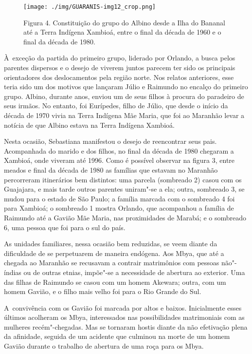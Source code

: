 \begin{figure}
  \centering
 \texttt{[image: ./img/GUARANIS-img12\_crop.png]}	
  \hfill
  \caption{Figura 4. Constituição do grupo do Albino desde a Ilha do Bananal até a Terra Indígena Xambioá, entre o final da década de 1960 e o final da década de 1980.}
\end{figure}
 

À~exceção da partida do primeiro grupo, liderado por Orlando, a busca
pelos parentes dispersos e o desejo de viverem juntos parecem ter sido
os principais orientadores dos deslocamentos pela região norte. Nos
relatos anteriores, esse teria sido um dos motivos que lançaram Júlio e
Raimundo no encalço do primeiro grupo. Albino, durante anos, enviou um
de seus filhos à procura do paradeiro de seus irmãos. No entanto, foi
Eurípedes, filho de Júlio, que desde o início da década de 1970 vivia na
Terra Indígena Mãe Maria, que foi ao Maranhão levar a notícia de que
Albino estava na Terra Indígena Xambioá.

Nesta ocasião, Sebastiana manifestou o desejo de reencontrar seus pais.
Acompanhada do marido e dos filhos, no final da década de 1980 chegaram
a Xambioá, onde viveram até 1996. Como é possível observar na figura 3,
entre meados e final da década de 1980 as famílias que estavam no
Maranhão percorreram itinerários bem distintos: uma parcela (sombreado
2) casou com os Guajajara, e mais tarde outros parentes uniram"-se a ela; 
outra, sombreado 3, se mudou para o estado de São Paulo; a
família marcada com o sombreado 4 foi para Xambioá; o sombreado 1
mostra Orlando, que acompanhou a família de Raimundo até a  Gavião
Mãe Maria, nas proximidades de Marabá; e o sombreado 6, uma pessoa que
foi para o sul do país.

As unidades familiares, nessa ocasião bem reduzidas, se veem diante da
dificuldade de se perpetuarem de maneira endógena. Aos Mbya, que até a
chegada ao Maranhão se recusavam a contrair matrimônios com pessoas
não"-índias ou de outras etnias, impõe"-se a necessidade de abertura ao
exterior. Uma das filhas de Raimundo se casou com um homem Akewara;
outra, com um homem Gavião, e o filho mais velho foi para o Rio Grande
do Sul. 

A~convivência com os Gavião foi marcada por altos e baixos. Inicialmente
esses últimos acolheram os Mbya, interessados nas possibilidades
matrimoniais com as mulheres recém"-chegadas. Mas se tornaram hostis
diante da não efetivação plena da afinidade, seguida de um acidente que
culminou na morte de um homem Gavião durante o trabalho de abertura de
uma roça para os Mbya.

